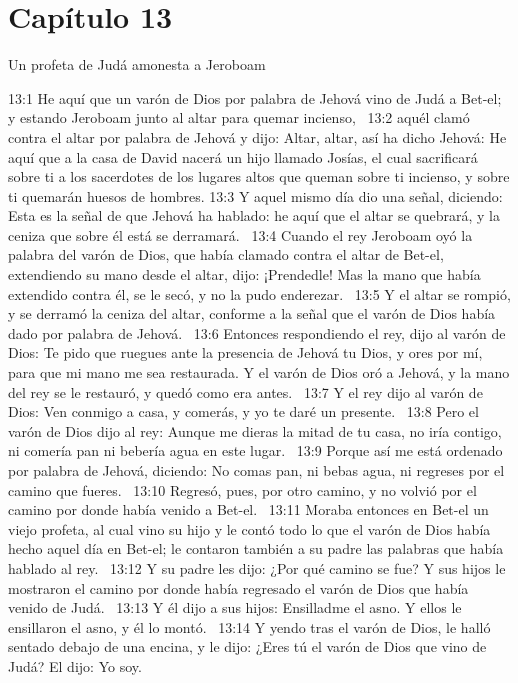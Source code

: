 \section*{Capítulo 13}
Un profeta de Judá amonesta a Jeroboam  

13:1 He aquí que un varón de Dios por palabra de Jehová vino de Judá a Bet-el; y estando Jeroboam junto al altar para quemar incienso,  
13:2 aquél clamó contra el altar por palabra de Jehová y dijo: Altar, altar, así ha dicho Jehová: He aquí que a la casa de David nacerá un hijo llamado Josías, el cual sacrificará sobre ti a los sacerdotes de los lugares altos que queman sobre ti incienso, y sobre ti quemarán huesos de hombres. 
13:3 Y aquel mismo día dio una señal, diciendo: Esta es la señal de que Jehová ha hablado: he aquí que el altar se quebrará, y la ceniza que sobre él está se derramará.  
13:4 Cuando el rey Jeroboam oyó la palabra del varón de Dios, que había clamado contra el altar de Bet-el, extendiendo su mano desde el altar, dijo: ¡Prendedle! Mas la mano que había extendido contra él, se le secó, y no la pudo enderezar.  
13:5 Y el altar se rompió, y se derramó la ceniza del altar, conforme a la señal que el varón de Dios había dado por palabra de Jehová.  
13:6 Entonces respondiendo el rey, dijo al varón de Dios: Te pido que ruegues ante la presencia de Jehová tu Dios, y ores por mí, para que mi mano me sea restaurada. Y el varón de Dios oró a Jehová, y la mano del rey se le restauró, y quedó como era antes.  
13:7 Y el rey dijo al varón de Dios: Ven conmigo a casa, y comerás, y yo te daré un presente.  
13:8 Pero el varón de Dios dijo al rey: Aunque me dieras la mitad de tu casa, no iría contigo, ni comería pan ni bebería agua en este lugar.  
13:9 Porque así me está ordenado por palabra de Jehová, diciendo: No comas pan, ni bebas agua, ni regreses por el camino que fueres.  
13:10 Regresó, pues, por otro camino, y no volvió por el camino por donde había venido a Bet-el.  
13:11 Moraba entonces en Bet-el un viejo profeta, al cual vino su hijo y le contó todo lo que el varón de Dios había hecho aquel día en Bet-el; le contaron también a su padre las palabras que había hablado al rey.  
13:12 Y su padre les dijo: ¿Por qué camino se fue? Y sus hijos le mostraron el camino por donde había regresado el varón de Dios que había venido de Judá.  
13:13 Y él dijo a sus hijos: Ensilladme el asno. Y ellos le ensillaron el asno, y él lo montó.  
13:14 Y yendo tras el varón de Dios, le halló sentado debajo de una encina, y le dijo: ¿Eres tú el varón de Dios que vino de Judá? El dijo: Yo soy.  

